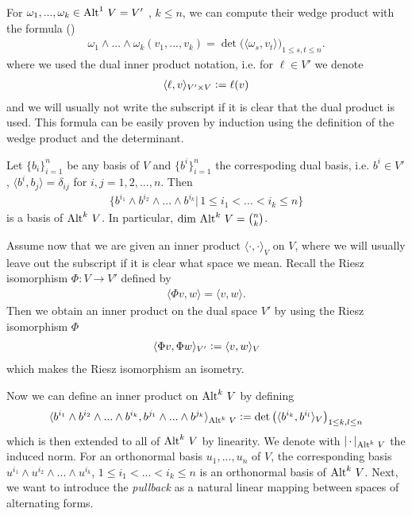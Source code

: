 \documentclass[../master_thesis.tex]{subfiles}
\begin{document}
For $\omega_1,...,\omega_k \in {\operatorname{Alt}^{1}\,V} = V'$
, $k \leq n$, we can compute their wedge product with the formula (\cite[p.260]{topology_and_geometry})
\begin{align}
    \omega_1 \wedge ... \wedge \omega_k (v_1,...,v_k)
    = \det \big( \langle \omega_s, v_t \rangle \big)_{1\leq s,t \leq n}. 
    \label{eq:wedge_product_of_one_forms}
\end{align}
where we used the dual inner product notation, i.e. for $\ell \in V'$ we denote 
\begin{align*}
    \langle \ell, v \rangle_{V' \times V} \vcentcolon= \ell (v)
\end{align*}
and we will usually not write the subscript if it is clear that the dual product is used.
This formula can be easily proven by induction using the definition of the 
wedge product and the determinant.

Let $\{ b_i\}_{i=1}^n$ be any basis of $V$ and $\{ b^i\}_{i=1}^n$ the 
correspoding dual basis, i.e. 
$b^i \in V'$, $\langle b^i, b_j \rangle = \delta_{ij}$ for $i,j = 1,2,..., n$. Then 
\begin{align*}
    \{b^{i_1} \wedge b^{i_2} \wedge ... \wedge b^{i_k} | \, 
    1 \leq i_1 < ... < i_k \leq n \}
\end{align*}
is a basis of ${\operatorname{Alt}^{k}\,V}$. In particular, 
$\dim\, {\operatorname{Alt}^{k}\,V} = \binom{n}{k}$.

Assume now that we are given an inner product $\langle \cdot, \cdot \rangle_V$ on $V$, 
where we will usually leave out the 
subscript if it is clear what space we mean.
Recall the Riesz isomorphism $\Phi: V \rightarrow V'$ defined by
\begin{align*}
   \langle \Phi v, w \rangle = \langle v, w \rangle.
\end{align*}
Then we obtain an inner 
product on the dual space $V'$ by using the Riesz isomorphism $\Phi$ 
\begin{align*}
    \langle \Phi v, \Phi w \rangle_{V'} \vcentcolon= \langle v, w \rangle_V
\end{align*}
which makes the Riesz isomorphism an isometry.

Now we can define an inner product on ${\operatorname{Alt}^{k}\,V}$ by defining
\begin{align}
    \langle b^{i_1} \wedge b^{i_2} \wedge... \wedge b^{i_k}, 
    b^{j_1} \wedge... \wedge b^{j_k} \rangle_{{\operatorname{Alt}^{k}\,V}} 
    \vcentcolon= \det  \big( \langle b^{i_k}, b^{i_l} \rangle_V \big)_
    {1\leq k,l \leq n} \label{eq:inner_product_alternating_forms}
\end{align}
which is then extended to all of ${\operatorname{Alt}^{k}\,V}$ by linearity. 
We denote with $\lvert \, \cdot\, \rvert _{\operatorname{Alt}^{k}\,V}$ the induced norm.
For an orthonormal basis 
$u_1,...,u_n$ of $V$, the corresponding basis 
$u^{i_1} \wedge u^{i_2} \wedge ... \wedge u^{i_k}$, 
$1\leq i_1 < ... < i_k \leq n$ is an orthonormal basis of ${\operatorname{Alt}^{k}\,V}$.
Next, we want to introduce the \textit{pullback} as a natural linear
mapping between spaces of alternating forms. 
\end{document}
